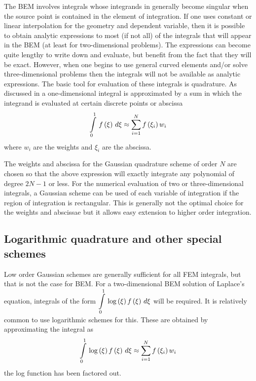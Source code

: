 The BEM involves integrals whose integrands in generally become singular when
the source point is contained in the element of integration.  If one uses
constant or linear interpolation for the geometry and dependent variable, then
it is possible to obtain analytic expressions to most (if not all) of the
integrals that will appear in the BEM (at least for two-dimensional problems).
The expressions can become quite lengthy to write down and evaluate, but
benefit from the fact that they will be exact.  However, when one begins to
use general curved elements and/or solve three-dimensional problems then the
integrals will not be available as analytic expressions.  The basic tool for
evaluation of these integrals is quadrature.  As discussed in
 a one-dimensional integral is approximated by a sum in
which the integrand is evaluated at certain discrete points or abscissa
\begin{equation*}
    \displaystyle\int\limits_{0}^{1} \, f\left( \xi \right) \,d\xi  \approx  \displaystyle\sum_{i=1}^{N}   f\left( \xi_{i} \right) w_{i}
\end{equation*}
where $w_{i}$ are the weights and $\xi_{i}$ are the abscissa.

The weights and abscissa for the Gaussian quadrature scheme of order $N$ are
chosen so that the above expression will exactly integrate any polynomial of
degree $2N-1$ or less.  For the numerical evaluation of two or
three-dimensional integrals, a Gaussian scheme can be used of each variable of
integration if the region of integration is rectangular.  This is generally
not the optimal choice for the weights and abscissae but it allows easy
extension to higher order integration.

\subsection{Logarithmic quadrature and other special schemes}

Low order Gaussian schemes are generally sufficient for all FEM integrals, but
that is not the case for BEM.  For a two-dimensional BEM solution of Laplace's
equation, integrals of the form $  \displaystyle\int\limits_{0}^{1} \,\log \left( \xi \right) f\left( \xi \right) \,d\xi $
will be required.  It is relatively common to use logarithmic schemes for
this.  These are obtained by approximating the integral as
\begin{equation*} 
    \displaystyle\int\limits_{0}^{1} \,\log \left( \xi \right) f\left( \xi \right) \,d\xi  \approx
   \displaystyle\sum_{i=1}^{N}   f\left( \xi_{i} \right) w_{i}
\end{equation*}   
\ie the log function has been factored out.  


